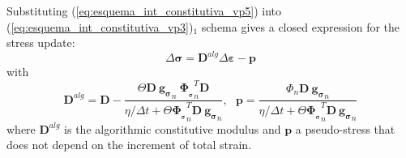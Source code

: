 \documentclass[Journal,letterpaper]{ascelike-new}
\newcommand{\Dsdee}{\boldsymbol{D}}
\newcommand{\dPhidsl}{\boldsymbol{\Phi_{_\sigma}}}
\newcommand{\dgds}{\boldsymbol{g_\sigma}}
\newcommand{\strain}{\boldsymbol{\varepsilon}}
\newcommand{\stress}{\boldsymbol{\sigma}}
\begin{document}
Substituting (\ref{eq:esquema_int_constitutiva_vp5}) into (\ref{eq:esquema_int_constitutiva_vp3})$_1$ schema gives a closed expression for the stress update:
\begin{equation}
	\label{eq:esquema_int_constitutiva_vp6}
	\Delta \stress = \Dsdee^{alg} \Delta \strain - \boldsymbol p
\end{equation}
with
\begin{equation}
	\label{eq:esquema_int_constitutiva_vp6}
	\Dsdee^{alg} = \Dsdee - \dfrac{\Theta \Dsdee~\dgds_n~\dPhidsl_n^T \Dsdee}{\eta/\Delta t+ \Theta \dPhidsl_n^T\Dsdee~\dgds_n},~~~\boldsymbol p = \dfrac{\Phi_n \Dsdee ~\dgds_n}{\eta/\Delta t+ \Theta \dPhidsl_n^T\Dsdee~\dgds_n}
\end{equation}
where $\Dsdee^{alg}$ is the algorithmic constitutive modulus and $\boldsymbol p$ a pseudo-stress that does not depend on the increment of total strain.
\end{document}
